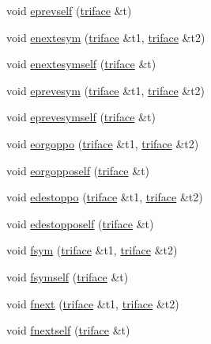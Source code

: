 \begin{DoxyCompactItemize}
\item 
void \hyperlink{classtetgenmesh_adf5410985bba6ea50ce8f1efdfc97fde}{eprevself} (\hyperlink{classtetgenmesh_1_1triface}{triface} \&t)
\item 
void \hyperlink{classtetgenmesh_a593fc155043632c528675e7297976aff}{enextesym} (\hyperlink{classtetgenmesh_1_1triface}{triface} \&t1, \hyperlink{classtetgenmesh_1_1triface}{triface} \&t2)
\item 
void \hyperlink{classtetgenmesh_a532ef2752219b80766e145980178443e}{enextesymself} (\hyperlink{classtetgenmesh_1_1triface}{triface} \&t)
\item 
void \hyperlink{classtetgenmesh_a337957bc71d4df951a580bf88f10b437}{eprevesym} (\hyperlink{classtetgenmesh_1_1triface}{triface} \&t1, \hyperlink{classtetgenmesh_1_1triface}{triface} \&t2)
\item 
void \hyperlink{classtetgenmesh_a548dec05fd31790f2ae36cf3890ffb15}{eprevesymself} (\hyperlink{classtetgenmesh_1_1triface}{triface} \&t)
\item 
void \hyperlink{classtetgenmesh_ab1f8638a5434bf92e2bd5b9ab6b6821c}{eorgoppo} (\hyperlink{classtetgenmesh_1_1triface}{triface} \&t1, \hyperlink{classtetgenmesh_1_1triface}{triface} \&t2)
\item 
void \hyperlink{classtetgenmesh_aed07e7ee176bd89f22980bb03038901e}{eorgoppoself} (\hyperlink{classtetgenmesh_1_1triface}{triface} \&t)
\item 
void \hyperlink{classtetgenmesh_add3f2c43dc33c89193b6237146c1485b}{edestoppo} (\hyperlink{classtetgenmesh_1_1triface}{triface} \&t1, \hyperlink{classtetgenmesh_1_1triface}{triface} \&t2)
\item 
void \hyperlink{classtetgenmesh_a6297abd8812062a029716cf1a4ff5b0e}{edestoppoself} (\hyperlink{classtetgenmesh_1_1triface}{triface} \&t)
\item 
void \hyperlink{classtetgenmesh_ab53db19d6ec094dfcd35dcfc02270d72}{fsym} (\hyperlink{classtetgenmesh_1_1triface}{triface} \&t1, \hyperlink{classtetgenmesh_1_1triface}{triface} \&t2)
\item 
void \hyperlink{classtetgenmesh_a57b18059c68cacbe01720c387c19ee9e}{fsymself} (\hyperlink{classtetgenmesh_1_1triface}{triface} \&t)
\item 
void \hyperlink{classtetgenmesh_a1aec13642da07ff1a874fccf9b62eca5}{fnext} (\hyperlink{classtetgenmesh_1_1triface}{triface} \&t1, \hyperlink{classtetgenmesh_1_1triface}{triface} \&t2)
\item 
void \hyperlink{classtetgenmesh_a473568d02dfc5c262325ed18b1f9af3a}{fnextself} (\hyperlink{classtetgenmesh_1_1triface}{triface} \&t)

\end{DoxyCompactItemize}
